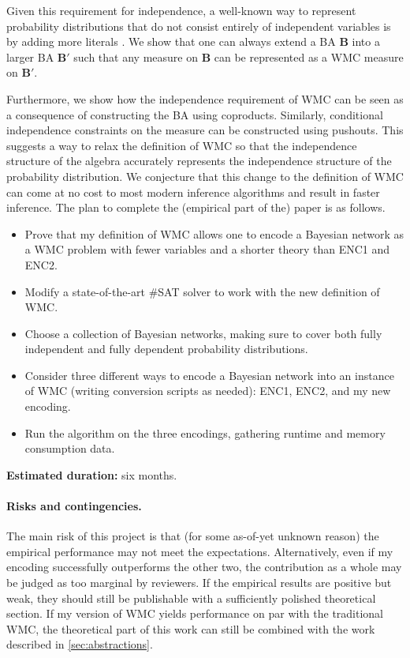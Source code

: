 \documentclass{article}
\begin{document}
Given this requirement for independence, a well-known way to represent
probability distributions that do not consist entirely of independent variables
is by adding more literals \cite{DBLP:journals/ai/ChaviraD08}. We show that one
can always extend a BA $\mathbf{B}$ into a larger BA $\mathbf{B'}$ such that any
measure on $\mathbf{B}$ can be represented as a WMC measure on $\mathbf{B'}$.

Furthermore, we show how the independence requirement of WMC can be seen as a
consequence of constructing the BA using coproducts. Similarly, conditional
independence constraints on the measure can be constructed using pushouts. This
suggests a way to relax the definition of WMC so that the independence structure
of the algebra accurately represents the independence structure of the
probability distribution. We conjecture that this change to the definition
of WMC can come at no cost to most modern inference algorithms and result in
faster inference. The plan to complete the (empirical part of the) paper is as
follows.
\begin{itemize}
\item Prove that my definition of WMC allows one to encode a Bayesian network as
  a WMC problem with fewer variables and a shorter theory than ENC1 and ENC2.
\item Modify a state-of-the-art \#SAT solver to work with the new definition of
  WMC.
\item Choose a collection of Bayesian networks, making sure to cover both fully
  independent and fully dependent probability distributions.
\item Consider three different ways to encode a Bayesian network into an
  instance of WMC (writing conversion scripts as needed): ENC1, ENC2, and my new
  encoding.
\item Run the algorithm on the three encodings, gathering runtime and memory
  consumption data.
\end{itemize}
{\bf Estimated duration:} six months.

\paragraph{Risks and contingencies.} The main risk of this project is that (for
some as-of-yet unknown reason) the empirical performance may not meet the
expectations. Alternatively, even if my encoding successfully outperforms the
other two, the contribution as a whole may be judged as too marginal by
reviewers. If the empirical results are positive but weak, they should still be
publishable with a sufficiently polished theoretical section. If my version of
WMC yields performance on par with the traditional WMC, the theoretical part of
this work can still be combined with the work described in
\cref{sec:abstractions}.
\end{document}
